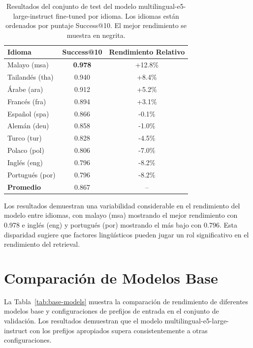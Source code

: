 \documentclass[a4paper,openany]{memoir}
\begin{document}
\begin{table}[htbp]
  \centering
  \caption{Resultados del conjunto de test del modelo multilingual-e5-large-instruct fine-tuned por idioma. Los idiomas están ordenados por puntaje Success@10. El mejor rendimiento se muestra en negrita.}
  \label{tab:test-results-by-language}
  \begin{tabular}{lcc}
    \toprule
    \textbf{Idioma} & \textbf{Success@10} & \textbf{Rendimiento Relativo} \\
    \midrule
    Malayo (msa) & \textbf{0.978} & +12.8\% \\
    Tailandés (tha) & 0.940 & +8.4\% \\
    Árabe (ara) & 0.912 & +5.2\% \\
    Francés (fra) & 0.894 & +3.1\% \\
    Español (spa) & 0.866 & -0.1\% \\
    Alemán (deu) & 0.858 & -1.0\% \\
    Turco (tur) & 0.828 & -4.5\% \\
    Polaco (pol) & 0.806 & -7.0\% \\
    Inglés (eng) & 0.796 & -8.2\% \\
    Portugués (por) & 0.796 & -8.2\% \\
    \midrule
    \textbf{Promedio} & 0.867 & -- \\
    \bottomrule
  \end{tabular}
\end{table}

Los resultados demuestran una variabilidad considerable en el rendimiento del modelo entre idiomas, con malayo (msa) mostrando el mejor rendimiento con 0.978 e inglés (eng) y portugués (por) mostrando el más bajo con 0.796. Esta disparidad sugiere que factores lingüísticos pueden jugar un rol significativo en el rendimiento del retrieval.

\section{Comparación de Modelos Base}

La Tabla~\ref{tab:base-models} muestra la comparación de rendimiento de diferentes modelos base y configuraciones de prefijos de entrada en el conjunto de validación. Los resultados demuestran que el modelo multilingual-e5-large-instruct con los prefijos apropiados supera consistentemente a otras configuraciones.
\end{document}
